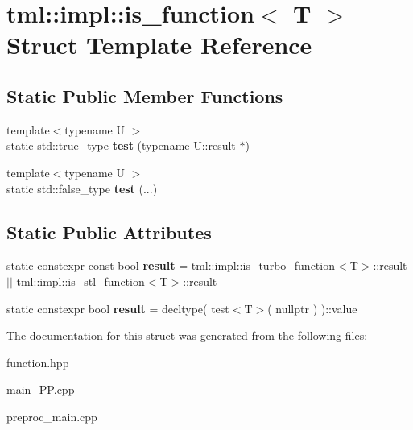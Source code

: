 \hypertarget{structtml_1_1impl_1_1is__function}{\section{tml\+:\+:impl\+:\+:is\+\_\+function$<$ T $>$ Struct Template Reference}
\label{structtml_1_1impl_1_1is__function}
}
\subsection*{Static Public Member Functions}
\begin{DoxyCompactItemize}
\item 
\hypertarget{structtml_1_1impl_1_1is__function_abb1523d86db0708effad95611c757737}{{\footnotesize template$<$typename U $>$ }\\static std\+::true\+\_\+type {\bfseries test} (typename U\+::result $\ast$)}\label{structtml_1_1impl_1_1is__function_abb1523d86db0708effad95611c757737}

\item 
\hypertarget{structtml_1_1impl_1_1is__function_ac674091918bc7b4c786c527c4d95bf00}{{\footnotesize template$<$typename U $>$ }\\static std\+::false\+\_\+type {\bfseries test} (...)}\label{structtml_1_1impl_1_1is__function_ac674091918bc7b4c786c527c4d95bf00}

\end{DoxyCompactItemize}
\subsection*{Static Public Attributes}
\begin{DoxyCompactItemize}
\item 
\hypertarget{structtml_1_1impl_1_1is__function_ad418c99e183dd8349488755f4215163f}{static constexpr const bool {\bfseries result} = \hyperlink{structtml_1_1impl_1_1is__turbo__function}{tml\+::impl\+::is\+\_\+turbo\+\_\+function}$<$T$>$\+::result $\vert$$\vert$ \hyperlink{structtml_1_1impl_1_1is__stl__function}{tml\+::impl\+::is\+\_\+stl\+\_\+function}$<$T$>$\+::result}\label{structtml_1_1impl_1_1is__function_ad418c99e183dd8349488755f4215163f}

\item 
\hypertarget{structtml_1_1impl_1_1is__function_a271d2c94dee2b35290044be58c7d8b2b}{static constexpr bool {\bfseries result} = decltype( test$<$T$>$( nullptr ) )\+::value}\label{structtml_1_1impl_1_1is__function_a271d2c94dee2b35290044be58c7d8b2b}

\end{DoxyCompactItemize}


The documentation for this struct was generated from the following files\+:\begin{DoxyCompactItemize}
\item 
function.\+hpp\item 
main\+\_\+\+P\+P.\+cpp\item 
preproc\+\_\+main.\+cpp\end{DoxyCompactItemize}
